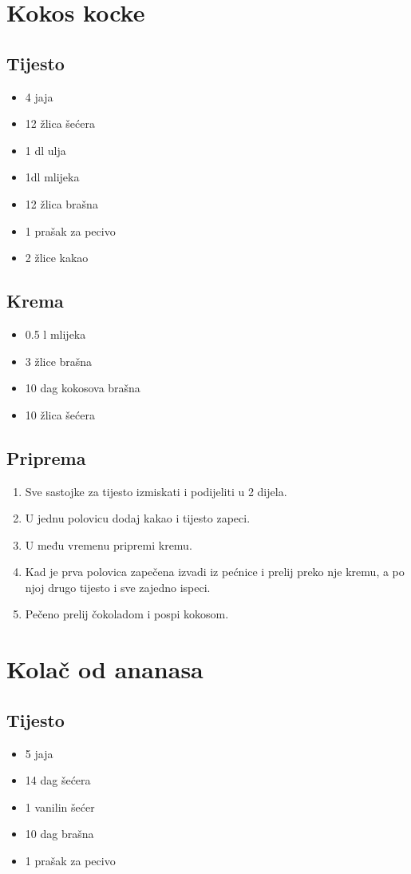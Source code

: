 \documentclass{article}
\begin{document}
\section{Kokos kocke}
\subsection{Tijesto}
\begin{itemize}
  \item 4 jaja
  \item 12 žlica šećera
  \item 1 dl ulja
  \item 1dl mlijeka
  \item 12 žlica brašna
  \item 1 prašak za pecivo
  \item 2 žlice kakao
\end{itemize}

\subsection{Krema}
\begin{itemize}
  \item 0.5 l mlijeka
  \item 3 žlice brašna
  \item 10 dag kokosova brašna
  \item 10 žlica šećera
\end{itemize}

\subsection{Priprema}
\begin{enumerate}
  \item Sve sastojke za tijesto izmiskati i podijeliti u 2 dijela.
  \item U jednu polovicu dodaj kakao i tijesto zapeci.
  \item U među vremenu pripremi kremu.
  \item Kad je prva polovica zapečena izvadi iz pećnice i prelij preko nje kremu, a po njoj drugo tijesto i sve zajedno ispeci.
  \item Pečeno prelij čokoladom i pospi kokosom.
\end{enumerate}


\section{Kolač od ananasa}
\subsection{Tijesto}
\begin{itemize}
  \item 5 jaja
  \item 14 dag šećera
  \item 1 vanilin šećer
  \item 10 dag brašna
  \item 1 prašak za pecivo
\end{itemize}
\end{document}
